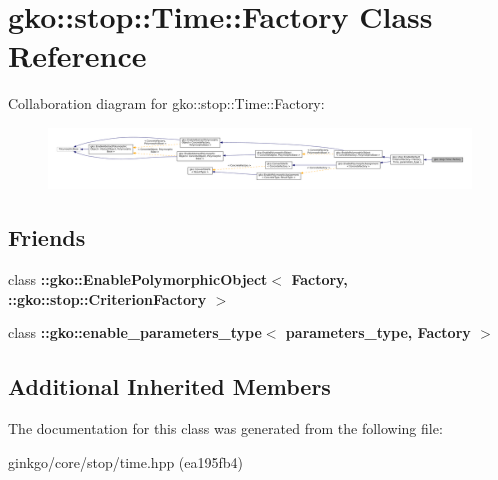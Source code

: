 \hypertarget{classgko_1_1stop_1_1Time_1_1Factory}{}\section{gko\+:\+:stop\+:\+:Time\+:\+:Factory Class Reference}
\label{classgko_1_1stop_1_1Time_1_1Factory}


Collaboration diagram for gko\+:\+:stop\+:\+:Time\+:\+:Factory\+:
\nopagebreak
\begin{figure}[H]
\begin{center}
\leavevmode
\includegraphics[width=350pt]{classgko_1_1stop_1_1Time_1_1Factory__coll__graph}
\end{center}
\end{figure}
\subsection*{Friends}
\begin{DoxyCompactItemize}
\item 
\mbox{\label{classgko_1_1stop_1_1Time_1_1Factory_aaa5507cf00e5361a77971746fefa42e6}} 
class {\bfseries \+::gko\+::\+Enable\+Polymorphic\+Object$<$ Factory, \+::gko\+::stop\+::\+Criterion\+Factory $>$}
\item 
\mbox{\label{classgko_1_1stop_1_1Time_1_1Factory_a0d176cbd42d6214e11aee8c30ca256fc}} 
class {\bfseries \+::gko\+::enable\+\_\+parameters\+\_\+type$<$ parameters\+\_\+type, Factory $>$}
\end{DoxyCompactItemize}
\subsection*{Additional Inherited Members}


The documentation for this class was generated from the following file\+:\begin{DoxyCompactItemize}
\item 
ginkgo/core/stop/time.\+hpp (ea195fb4)\end{DoxyCompactItemize}
